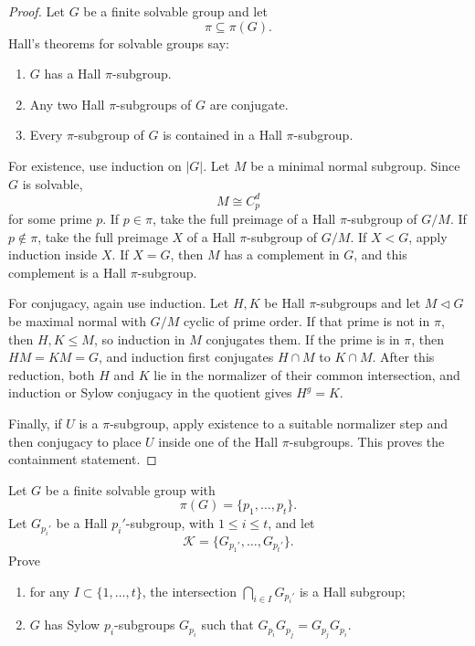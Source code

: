 \begin{proof}
Let \(G\) be a finite solvable group and let
\[
    \pi\subseteq \pi(G).
\]
Hall's theorems for solvable groups say:
\begin{enumerate}[label=\textup{(\arabic*)}]
    \item \(G\) has a Hall \(\pi\)-subgroup.
    \item Any two Hall \(\pi\)-subgroups of \(G\) are conjugate.
    \item Every \(\pi\)-subgroup of \(G\) is contained in a Hall
    \(\pi\)-subgroup.
\end{enumerate}

For existence, use induction on \(|G|\). Let \(M\) be a minimal normal subgroup.
Since \(G\) is solvable,
\[
    M\cong C_p^d
\]
for some prime \(p\). If \(p\in\pi\), take the full preimage of a Hall
\(\pi\)-subgroup of \(G/M\). If \(p\notin\pi\), take the full preimage \(X\) of
a Hall \(\pi\)-subgroup of \(G/M\). If \(X<G\), apply induction inside \(X\).
If \(X=G\), then \(M\) has a complement in \(G\), and this complement is a Hall
\(\pi\)-subgroup.

For conjugacy, again use induction. Let \(H,K\) be Hall \(\pi\)-subgroups and
let \(M\lhd G\) be maximal normal with \(G/M\) cyclic of prime order. If that
prime is not in \(\pi\), then \(H,K\leq M\), so induction in \(M\) conjugates
them. If the prime is in \(\pi\), then \(HM=KM=G\), and induction first
conjugates \(H\cap M\) to \(K\cap M\). After this reduction, both \(H\) and
\(K\) lie in the normalizer of their common intersection, and induction or
Sylow conjugacy in the quotient gives \(H^g=K\).

Finally, if \(U\) is a \(\pi\)-subgroup, apply existence to a suitable normalizer
step and then conjugacy to place \(U\) inside one of the Hall \(\pi\)-subgroups.
This proves the containment statement.
\end{proof}

\begin{exercise}
Let \(G\) be a finite solvable group with
\[
    \pi(G) = \{p_1,\ldots,p_t\}.
\]
Let \(G_{p_i'}\) be a Hall \(p_i'\)-subgroup, with \(1 \leq i \leq t\), and let
\[
    \mathcal{K} = \{G_{p_1'},\ldots,G_{p_t'}\}.
\]
Prove
\begin{enumerate}[label=(\alph*)]
    \item for any \(I \subset \{1,\ldots,t\}\), the intersection
    \(\bigcap_{i\in I} G_{p_i'}\) is a Hall subgroup;
    \item \(G\) has Sylow \(p_i\)-subgroups \(G_{p_i}\) such that
    \(G_{p_i}G_{p_j} = G_{p_j}G_{p_i}\).
\end{enumerate}
\end{exercise}

